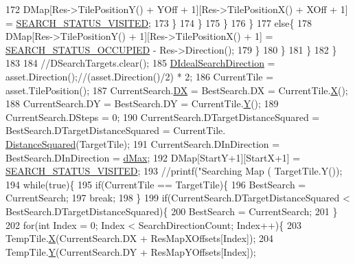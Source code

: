 \begin{DoxyCode}
172                                 DMap[Res->TilePositionY() + YOff + 1][Res->TilePositionX() + XOff + 1] = 
      \hyperlink{RouterMap_8cpp_ae8b1ae5dd44be7811fb48e54c1194503}{SEARCH\_STATUS\_VISITED};
173                             \}
174                         \}
175                     \}
176                 \}
177                 \textcolor{keywordflow}{else}\{
178                     DMap[Res->TilePositionY() + 1][Res->TilePositionX() + 1] = 
      \hyperlink{RouterMap_8cpp_ade7d48394ed5ca89b019914cb5e7a9da}{SEARCH\_STATUS\_OCCUPIED} - Res->Direction();   
179                 \}
180             \}
181         \}
182     \}
183     
184     \textcolor{comment}{//DSearchTargets.clear();}
185     \hyperlink{classCRouterMap_addf4151d25670daf5cb45058e978fde2}{DIdealSearchDirection} = asset.Direction();\textcolor{comment}{//(asset.Direction()/2) * 2;}
186     CurrentTile = asset.TilePosition();
187     CurrentSearch.\hyperlink{classCPosition_a28445f9b872169715919074d82044eda}{DX} = BestSearch.DX = CurrentTile.\hyperlink{classCPosition_a9a6b94d3b91df1492d166d9964c865fc}{X}();
188     CurrentSearch.DY = BestSearch.DY = CurrentTile.\hyperlink{classCPosition_a1aa8a30e2f08dda1f797736ba8c13a87}{Y}();
189     CurrentSearch.DSteps = 0;
190     CurrentSearch.DTargetDistanceSquared = BestSearch.DTargetDistanceSquared = CurrentTile.
      \hyperlink{classCPosition_acd96d507f44c0fdf13036ebc1a09e59c}{DistanceSquared}(TargetTile);
191     CurrentSearch.DInDirection = BestSearch.DInDirection = \hyperlink{GameDataTypes_8h_acb2b033915f6659a71a38b5aa6e4eb42af6546049275557ce0ade2ceee042a319}{dMax};
192     DMap[StartY+1][StartX+1] = \hyperlink{RouterMap_8cpp_ae8b1ae5dd44be7811fb48e54c1194503}{SEARCH\_STATUS\_VISITED};
193     \textcolor{comment}{//printf("Searching Map (%
       TargetTile.Y());}
194     \textcolor{keywordflow}{while}(\textcolor{keyword}{true})\{
195         \textcolor{keywordflow}{if}(CurrentTile == TargetTile)\{
196             BestSearch = CurrentSearch;
197             \textcolor{keywordflow}{break};
198         \}
199         \textcolor{keywordflow}{if}(CurrentSearch.DTargetDistanceSquared < BestSearch.DTargetDistanceSquared)\{
200             BestSearch = CurrentSearch;
201         \}
202         \textcolor{keywordflow}{for}(\textcolor{keywordtype}{int} Index = 0; Index < SearchDirectionCount; Index++)\{
203             TempTile.\hyperlink{classCPosition_a9a6b94d3b91df1492d166d9964c865fc}{X}(CurrentSearch.DX + ResMapXOffsets[Index]);
204             TempTile.\hyperlink{classCPosition_a1aa8a30e2f08dda1f797736ba8c13a87}{Y}(CurrentSearch.DY + ResMapYOffsets[Index]);

\end{DoxyCode}
